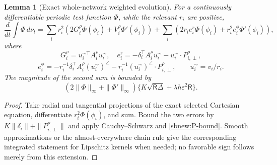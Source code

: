 \documentclass{article} %
\theoremstyle{plain}
\newtheorem{lemma}[theorem]{Lemma}
\theoremstyle{definition}
\theoremstyle{remark}
\begin{document}
\begin{lemma}[Exact whole-network weighted evolution]
\label{sbnew:measure-evolution}
For a continuously differentiable periodic test function $\Phi$, while
the relevant $r_i$ are positive,
\begin{equation}\label{sbnew:measure-derivative}
 \frac d{dt}\int\Phi\,d\nu_t
 =\sum_i r_i^2(2G_i^\rho\Phi(\phi_i)+V_i^\rho\Phi'(\phi_i))
 +\sum_i(2r_i e_i^r\Phi(\phi_i)+r_i^2e_i^\phi\Phi'(\phi_i)),
\end{equation}
where
\[
 G_i^\rho=u_i^{\sim\top}A_i^\rho u_i^\sim,
 \quad e_i^r=-\delta_i^\top A_i^\rho u_i^\sim-u_i^\sim\cdot P_{i,\perp}^\rho,
\]
\[
 e_i^\phi=-r_i^{-1}\delta_i^\top A_i^\rho (u_i^\sim)^\angle
             -r_i^{-1}(u_i^\sim)^\angle\cdot P_{i,\perp}^\rho,
 \qquad u_i^\sim=v_i/r_i.
\]
The magnitude of the second sum is bounded by
\begin{equation}\label{sbnew:measure-error}
 (2\|\Phi\|_\infty+\|\Phi'\|_\infty)
 \{K\sqrt{\mathsf R\Delta}+\lambda h\varepsilon^2\mathsf R\}.
\end{equation}
\end{lemma}
\begin{proof}
Take radial and tangential projections of the exact selected Cartesian
equation, differentiate $r_i^2\Phi(\phi_i)$, and sum. Bound the two
errors by $K\|\delta_i\|+\|P_{i,\perp}^\rho\|$ and apply
Cauchy--Schwarz and \eqref{sbnew:P-bound}. Smooth approximations or the
almost-everywhere chain rule give the corresponding integrated statement
for Lipschitz kernels when needed; no favorable sign follows merely from
this extension.
\end{proof}
\end{document}
